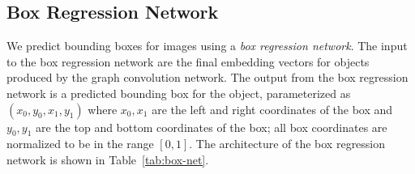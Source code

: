 \documentclass[10pt,twocolumn,letterpaper]{article}
\begin{document}
\begin{table}
  \centering
  \setlength{\tabcolsep}{1mm}
  \vspace{1mm}
  \caption{
    Architecture of the graph convolution network used to process input scene graphs.
    The input scene graph has $O$ objects and $R$ relationships. Due to weight sharing
    in graph convolutions, the same network can process graphs of any size or topology.
    The notation gconv($D_{in}\to H\to D_{out}$) is graph convolution with input dimension
    $D_{in}$, hidden dimension $H$, and output dimension $D_{out}$.
  }
  \label{tab:gconv-net}
\end{table}

\subsection{Box Regression Network}
We predict bounding boxes for images using a \emph{box regression network}. The input to the
box regression network are the final embedding vectors for objects produced by the graph
convolution network. The output from the box regression network is a predicted bounding box for
the object, parameterized as $(x_0, y_0, x_1, y_1)$ where $x_0, x_1$ are the left and right coordinates
of the box and $y_0,y_1$ are the top and bottom coordinates of the box; all box coordinates are normalized
to be in the range $[0, 1]$. The architecture of the box regression network is shown in
Table~\ref{tab:box-net}.
\end{document}
